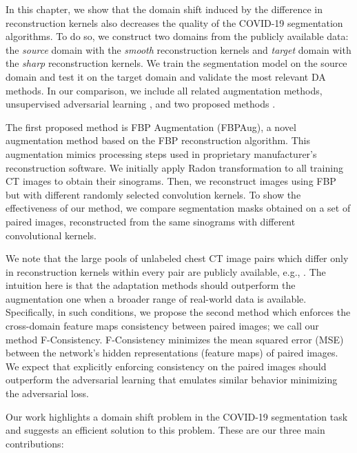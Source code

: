 In this chapter, we show that the domain shift induced by the difference in reconstruction kernels also decreases the quality of the COVID-19 segmentation algorithms. To do so, we construct two domains from the publicly available data: the \textit{source} domain with the \textit{smooth} reconstruction kernels and \textit{target} domain with the \textit{sharp} reconstruction kernels. We train the segmentation model on the source domain and test it on the target domain and validate the most relevant DA methods. In our comparison, we include all related augmentation methods, unsupervised adversarial learning \cite{ganin2015unsupervised}, and two proposed methods \cite{saparov2021zero,shimovolos2022adaptation}.
 
The first proposed method is FBP Augmentation (FBPAug), a novel augmentation method based on the FBP reconstruction algorithm. This augmentation mimics processing steps used in proprietary manufacturer's reconstruction software. We initially apply Radon transformation to all training CT images to obtain their sinograms. Then, we reconstruct images using FBP but with different randomly selected convolution kernels. To show the effectiveness of our method, we compare segmentation masks obtained on a set of paired images, reconstructed from the same sinograms with different convolutional kernels.%

We note that the large pools of unlabeled chest CT image pairs which differ only in reconstruction kernels within every pair are publicly available, e.g., \cite{morozov2021simplified}. The intuition here is that the adaptation methods should outperform the augmentation one when a broader range of real-world data is available. Specifically, in such conditions, we propose the second method which enforces the cross-domain feature maps consistency between paired images; we call our method F-Consistency. F-Consistency minimizes the mean squared error (MSE) between the network’s hidden representations (feature maps) of paired images. We expect that explicitly enforcing consistency on the paired images should outperform the adversarial learning that emulates similar behavior minimizing the adversarial loss.

Our work highlights a domain shift problem in the COVID-19 segmentation task and suggests an efficient solution to this problem. These are our three main contributions:

